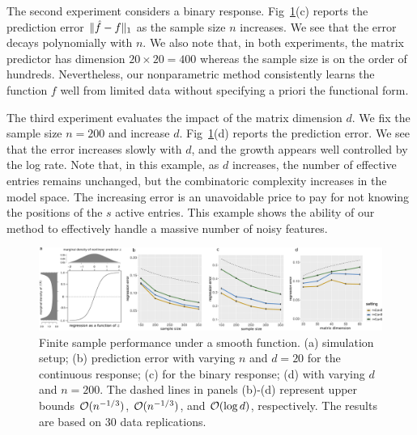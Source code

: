 \documentclass[aos]{imsart}
\theoremstyle{definition}
\begin{document}
The second experiment considers a binary response. Fig~\ref{fig:logistic}(c) reports the prediction error $\lVert\hat f - f\rVert_1$ as the sample size $n$ increases. We see that the error decays polynomially with $n$. We also note that, in both experiments, the matrix predictor has dimension $20 \times 20=400$ whereas the sample size is on the order of hundreds. Nevertheless, our nonparametric method consistently learns the function $f$ well from limited data without specifying a priori the functional form.

The third experiment evaluates the impact of the matrix dimension $d$. We fix the sample size $n=200$ and increase $d$. Fig~\ref{fig:logistic}(d) reports the prediction error. We see that  the error increases slowly with $d$, and the growth appears well controlled by the log rate. Note that, in this example, as $d$ increases, the number of effective entries remains unchanged, but the combinatoric complexity increases in the model space. The increasing error is an unavoidable price to pay for not knowing the positions of the $s$ active entries. This example shows the ability of our method to effectively handle a massive number of noisy features. 

\begin{figure}[b!]
\centering
\includegraphics[width=\textwidth]{figure/combined_logistic.pdf}
\caption{Finite sample performance under a smooth function. (a) simulation setup; (b) prediction error with varying $n$ and $d=20$ for the continuous response; (c) for the binary response; (d) with varying $d$ and $n=200$. The dashed lines in panels (b)-(d) represent upper bounds $\mathcal{O}(n^{-1/3})$, $\mathcal{O}(n^{-1/3})$, and $\mathcal{O}(\log d)$, respectively. The results are based on 30 data replications.} %
\label{fig:logistic}
\end{figure}
\end{document}
